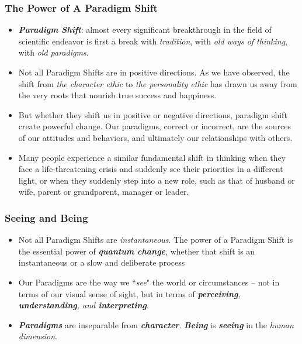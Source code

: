\documentclass[11pt]{article}
\begin{document}
\subsubsection{The Power of A Paradigm Shift}
\begin{itemize}
\item \emph{\textbf{Paradigm Shift}}: almost every significant breakthrough in the field of scientific endeavor is first a break with \emph{tradition}, with \emph{old ways of thinking}, with \emph{old paradigms}.

\item Not all Paradigm Shifts are in positive directions. As we have observed, the shift from \emph{the character ethic} to \emph{the personality ethic} has drawn us away from the very roots that nourish true success and happiness.

\item But whether they shift us in positive or negative directions, paradigm shift create powerful change. Our paradigms, correct or incorrect, are the sources of our attitudes and behaviors, and ultimately our relationships with others.

\item Many people experience a similar fundamental shift in thinking when they face a life-threatening crisis and suddenly see their priorities in a different light, or when they suddenly step into a new role, such as that of husband or wife, parent or grandparent, manager or leader.
\end{itemize}
\subsubsection{Seeing and Being}
\begin{itemize}
\item Not all Paradigm Shifts are \emph{instantaneous}. The power of a Paradigm Shift is the essential power of \emph{\textbf{quantum change}}, whether that shift is an instantaneous or a slow and deliberate process

\item Our Paradigms are the way we ``\emph{see}" the world or circumstances -- not in terms of our visual sense of sight, but in terms of \emph{\textbf{perceiving}, \textbf{understanding}, and \textbf{interpreting}}. 

\item \emph{\textbf{Paradigms}} are inseparable from \emph{\textbf{character}}. \emph{\textbf{Being}} is \emph{\textbf{seeing}} in the \emph{human dimension}.
\end{itemize}
\end{document}
